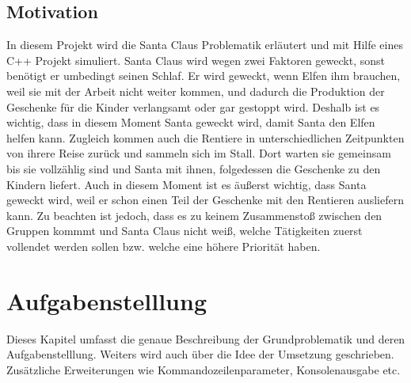 \documentclass[a4paper,12pt]{article}
\begin{document}
\subsection{Motivation}
In diesem Projekt wird die Santa Claus Problematik erläutert und mit Hilfe eines C++ Projekt simuliert. Santa Claus wird wegen 
zwei Faktoren geweckt, sonst benötigt er umbedingt seinen Schlaf. Er wird geweckt, wenn Elfen ihm brauchen, weil sie mit der Arbeit
nicht weiter kommen, und dadurch die Produktion der Geschenke für die Kinder verlangsamt oder gar gestoppt wird. Deshalb ist es wichtig, dass 
in diesem Moment Santa geweckt wird, damit Santa den Elfen helfen kann. Zugleich kommen auch die Rentiere in unterschiedlichen Zeitpunkten von ihrere Reise zurück und sammeln sich im Stall.
Dort warten sie gemeinsam bis sie vollzählig sind und Santa mit ihnen, folgedessen die Geschenke zu den Kindern liefert. Auch in diesem Moment ist es
äußerst wichtig, dass Santa geweckt wird, weil er schon einen Teil der Geschenke mit den Rentieren ausliefern kann. Zu beachten ist jedoch, dass es zu keinem Zusammenstoß zwischen den Gruppen kommmt
und Santa Claus nicht weiß, welche Tätigkeiten zuerst vollendet werden sollen bzw. welche eine höhere Priorität haben.

\section{Aufgabenstelllung}
Dieses Kapitel umfasst die genaue Beschreibung der Grundproblematik und deren Aufgabenstelllung. Weiters wird auch über die Idee der Umsetzung geschrieben. Zusätzliche Erweiterungen wie
Kommandozeilenparameter, Konsolenausgabe etc.
\end{document}
